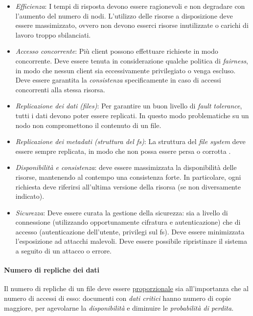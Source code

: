 \documentclass[11pt,a4paper,english]{article}
\begin{document}
\begin{itemize}
	\item \emph{Efficienza}: I tempi di risposta devono essere ragionevoli e non degradare con l'aumento del numero di nodi. L'utilizzo delle risorse a disposizione deve essere massimizzato, ovvero non devono esserci risorse inutilizzate o carichi di lavoro troppo sbilanciati.  
	
	\item \emph{Accesso concorrente}: Più client possono effettuare richieste in modo concorrente. Deve essere tenuta in considerazione qualche politica di \emph{fairness}, 
	in modo che nessun client sia eccessivamente privilegiato o venga escluso. Deve essere garantita la \emph{consistenza} specificamente in caso di accessi concorrenti alla stessa risorsa. 
	 
	\item \emph{Replicazione dei dati (files)}: Per garantire un buon livello di \emph{fault tolerance}, tutti i dati devono poter essere replicati. In questo modo problematiche su un nodo non compromettono il contenuto di un file. 
	
	\item \emph{Replicazione dei metadati (struttura del fs)}: La struttura del \emph{file system} deve essere sempre replicata, in modo che non possa essere persa o corrotta .
	
	\item \emph{Disponibilità e consistenza}: deve essere massimizzata la disponibilità delle risorse, mantenendo al contempo una consistenza forte. In particolare, ogni richiesta deve riferirsi all'ultima versione della risorsa (se non diversamente indicato).  
	
	\item \emph{Sicurezza}: Deve essere curata la gestione della sicurezza: sia a livello di connessione (utilizzando opportunamente cifratura e autenticazione) che di accesso (autenticazione dell'utente, privilegi sul fs). Deve essere minimizzata l'esposizione ad attacchi malevoli. Deve essere possibile ripristinare il sistema a seguito di un attacco o errore. 
\end{itemize} 



\paragraph{Numero di repliche dei dati}

Il numero di repliche di un file deve essere \underline{proporzionale} sia all'importanza che al numero di accessi di esso: documenti con \emph{dati critici} hanno numero di copie maggiore, per agevolarne la \emph{disponibilità} e diminuire le \emph{probabilità di perdita}. 
\end{document}
